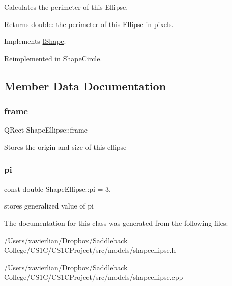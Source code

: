 Calculates the perimeter of this Ellipse. 

\begin{DoxyReturn}{Returns}
double\+: the perimeter of this Ellipse in pixels. 
\end{DoxyReturn}


Implements \mbox{\hyperlink{class_i_shape_a485f6770c4e56b31c76d368b959b6f00}{I\+Shape}}.



Reimplemented in \mbox{\hyperlink{class_shape_circle_ad393d13676b0d0fcb36346b9a90b74af}{Shape\+Circle}}.



\subsection{Member Data Documentation}
\mbox{\label{class_shape_ellipse_ac9feb0571e6f658866ab142643230081}} 
\subsubsection{\texorpdfstring{frame}{frame}}
{\footnotesize\ttfamily Q\+Rect Shape\+Ellipse\+::frame}

Stores the origin and size of this ellipse \mbox{\label{class_shape_ellipse_a8ee638d167c341015a7f0f82b7a8debb}} 
\subsubsection{\texorpdfstring{pi}{pi}}
{\footnotesize\ttfamily const double Shape\+Ellipse\+::pi = 3.}

stores generalized value of pi 

The documentation for this class was generated from the following files\+:\begin{DoxyCompactItemize}
\item 
/\+Users/xavierlian/\+Dropbox/\+Saddleback College/\+C\+S1\+C/\+C\+S1\+C\+Project/src/models/shapeellipse.\+h\item 
/\+Users/xavierlian/\+Dropbox/\+Saddleback College/\+C\+S1\+C/\+C\+S1\+C\+Project/src/models/shapeellipse.\+cpp\end{DoxyCompactItemize}
